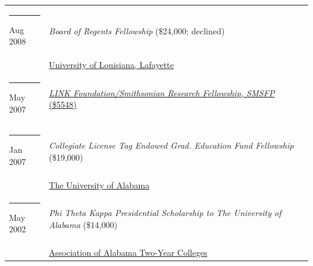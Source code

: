 \documentclass[margin,line]{res}
\begin{document}
\begin{resume}
\begin{longtable}{@{}p{0.7in}p{4in}}
\hspace*{-4mm} \rule{-1mm}{5mm} Aug 2008 & {\textit{Board of Regents Fellowship} (\$24,000; declined)}\\*
\hspace*{-4mm} \hspace*{-4mm} & \hspace{4mm} \href{https://louisiana.edu/}{University of Louisiana, Lafayette}\\
\hspace*{-4mm} \rule{-1mm}{5mm} May 2007 & \href{https://naturalhistory.si.edu/research/smithsonian-marine-station/education-and-fellowships/graduate-fellowships/link-fellowship}{\textit{LINK Foundation/Smithsonian Research Fellowship, SMSFP} (\$5548)}\\*
\hspace*{-4mm} \rule{-1mm}{5mm} Jan 2007 & {\textit{Collegiate License Tag Endowed Grad. Education Fund Fellowship} (\$19,000)}\\*
\hspace*{-4mm} \hspace*{-4mm} & \hspace{4mm} \href{https://www.ua.edu}{The University of Alabama}\\
\hspace*{-4mm} \rule{-1mm}{5mm} May 2002 & {\textit{Phi Theta Kappa Presidential Scholarship to The University of Alabama} (\$14,000)}\\*
\hspace*{-4mm} \hspace*{-4mm} & \hspace{4mm} \href{https://www.accs.edu}{Association of Alabama Two-Year Colleges}\\
\end{longtable}


\end{resume}
\end{document}
